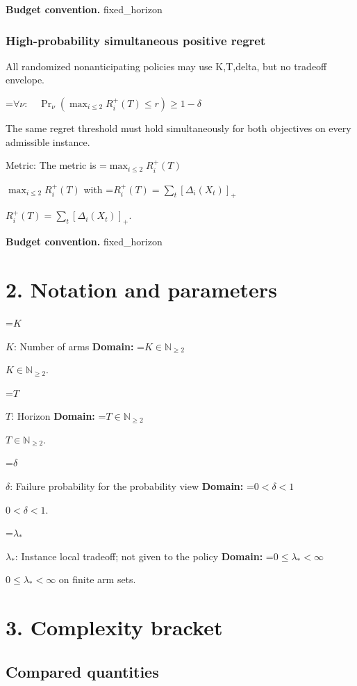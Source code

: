 \documentclass[10pt,a4paper]{article}
\newcommand{\AtlasMath}[1]{\par\begingroup\centering\setbox0=\hbox{$\displaystyle #1$}\ifdim\wd0>1.4\linewidth\typeout{ATLAS WIDE FORMULA: \the\wd0}\fi\ifdim\wd0>\linewidth\resizebox{\linewidth}{!}{\box0}\else\box0\fi\par\endgroup}
\newcommand{\AtlasInlineMath}[1]{\begingroup\setbox0=\hbox{$#1$}\ifdim\wd0>.4\linewidth\endgroup\AtlasMath{#1}\else\endgroup$#1$\fi}
\begin{document}
\textbf{Budget convention.} fixed\_horizon



\subsubsection{High-probability simultaneous positive regret}


All randomized nonanticipating policies may use K,T,delta, but no tradeoff envelope.




\AtlasMath{\forall\nu:\quad\Pr_\nu(\max_{i\le2}R_i^+(T)\le r)\ge1-\delta}




The same regret threshold must hold simultaneously for both objectives on every admissible instance.



Metric: The metric is \AtlasInlineMath{\max_{i\le2}R_i^+(T)} with \AtlasInlineMath{R_i^+(T)=\sum_t[\Delta_i(X_t)]_+}.



\textbf{Budget convention.} fixed\_horizon



\section{2. Notation and parameters}


\AtlasInlineMath{K}: Number of arms \textbf{Domain:} \AtlasInlineMath{K\in\mathbb N_{\ge2}}.



\AtlasInlineMath{T}: Horizon \textbf{Domain:} \AtlasInlineMath{T\in\mathbb N_{\ge2}}.



\AtlasInlineMath{\delta}: Failure probability for the probability view \textbf{Domain:} \AtlasInlineMath{0<\delta<1}.



\AtlasInlineMath{\lambda_*}: Instance local tradeoff; not given to the policy \textbf{Domain:} \AtlasInlineMath{0\le\lambda_*<\infty} on finite arm sets.



\section{3. Complexity bracket}


\subsection{Compared quantities}
\end{document}
